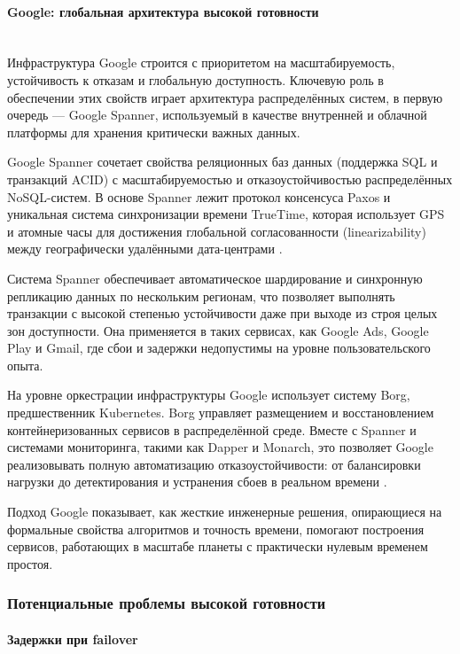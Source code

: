 \paragraph{Google: глобальная архитектура высокой готовности} ~\\

Инфраструктура Google строится с приоритетом на масштабируемость, устойчивость к отказам и глобальную доступность. Ключевую роль в обеспечении этих свойств играет архитектура распределённых систем, в первую очередь — Google Spanner, используемый в качестве внутренней и облачной платформы для хранения критически важных данных.

Google Spanner сочетает свойства реляционных баз данных (поддержка SQL и транзакций ACID) с масштабируемостью и отказоустойчивостью распределённых NoSQL-систем. В основе Spanner лежит протокол консенсуса Paxos и уникальная система синхронизации времени TrueTime, которая использует GPS и атомные часы для достижения глобальной согласованности (linearizability) между географически удалёнными дата-центрами \autocite{Corbett}.

Система Spanner обеспечивает автоматическое шардирование и синхронную репликацию данных по нескольким регионам, что позволяет выполнять транзакции с высокой степенью устойчивости даже при выходе из строя целых зон доступности. Она применяется в таких сервисах, как Google Ads, Google Play и Gmail, где сбои и задержки недопустимы на уровне пользовательского опыта.

На уровне оркестрации инфраструктуры Google использует систему Borg, предшественник Kubernetes. Borg управляет размещением и восстановлением контейнеризованных сервисов в распределённой среде. Вместе с Spanner и системами мониторинга, такими как Dapper и Monarch, это позволяет Google реализовывать полную автоматизацию отказоустойчивости: от балансировки нагрузки до детектирования и устранения сбоев в реальном времени \autocite{GoogleDremel}.

Подход Google показывает, как жесткие инженерные решения, опирающиеся на формальные свойства алгоритмов и точность времени, помогают построения сервисов, работающих в масштабе планеты с практически нулевым временем простоя.

\subsubsection{Потенциальные проблемы высокой готовности}

\paragraph{Задержки при failover} ~\\

